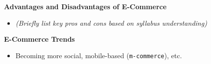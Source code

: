 \documentclass[a4paper, 8pt]{extarticle}
\newcommand{\subsectionheading}[1]{\normalsize\textbf{#1}}
\begin{document}
\begin{multicols}{2}
\subsectionheading{Advantages and Disadvantages of E-Commerce}
\begin{itemize}
    \item \textit{(Briefly list key pros and cons based on syllabus understanding)}
\end{itemize}

\subsectionheading{E-Commerce Trends}
\begin{itemize}
    \item Becoming more social, mobile-based (\texttt{m-commerce}), etc.
\end{itemize}


\end{multicols}
\end{document}
